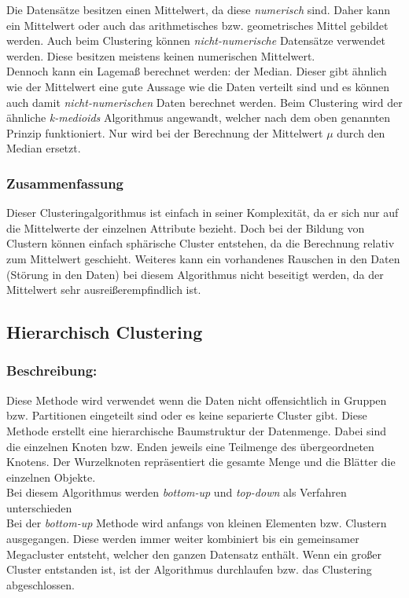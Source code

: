 Die Datensätze besitzen einen Mittelwert, da diese \textit{numerisch} sind. Daher kann ein Mittelwert oder auch das arithmetisches bzw. geometrisches Mittel gebildet werden. Auch beim Clustering können \textit{nicht-numerische} Datensätze verwendet werden. Diese besitzen meistens keinen numerischen Mittelwert.\\

Dennoch kann ein Lagemaß berechnet werden: der Median. Dieser gibt ähnlich wie der Mittelwert eine gute Aussage wie die Daten verteilt sind und es können auch damit \textit{nicht-numerischen} Daten berechnet werden. Beim Clustering wird der ähnliche \textit{k-medioids} Algorithmus angewandt, welcher  nach dem oben genannten Prinzip funktioniert. Nur wird bei der Berechnung der Mittelwert \(\mu\) durch den Median ersetzt. \cite{pell91}

\subsubsection{Zusammenfassung}
Dieser Clusteringalgorithmus ist einfach in seiner Komplexität, da er sich nur auf die Mittelwerte der einzelnen Attribute bezieht. Doch bei der Bildung von Clustern können einfach sphärische Cluster entstehen, da die Berechnung relativ zum Mittelwert geschieht. Weiteres kann ein vorhandenes Rauschen in den Daten (Störung in den Daten) bei diesem Algorithmus nicht beseitigt werden, da der Mittelwert sehr ausreißerempfindlich ist.


\subsection{Hierarchisch Clustering}
\subsubsection{Beschreibung:}
Diese Methode wird verwendet wenn die Daten nicht offensichtlich in Gruppen bzw. Partitionen eingeteilt sind oder es keine separierte Cluster gibt. Diese Methode erstellt eine hierarchische Baumstruktur der Datenmenge. Dabei sind die einzelnen Knoten bzw. Enden jeweils eine Teilmenge des übergeordneten Knotens. Der Wurzelknoten repräsentiert die gesamte Menge und die Blätter die einzelnen Objekte.\\

Bei diesem Algorithmus werden \textit{bottom-up} und \textit{top-down} als Verfahren unterschieden\\

Bei der \textit{bottom-up} Methode wird anfangs von kleinen Elementen bzw. Clustern ausgegangen. Diese werden immer weiter kombiniert bis ein gemeinsamer Megacluster entsteht, welcher den ganzen Datensatz enthält. Wenn ein großer Cluster entstanden ist, ist der Algorithmus durchlaufen bzw. das Clustering abgeschlossen.\cite{jain99, mitch97}\\

